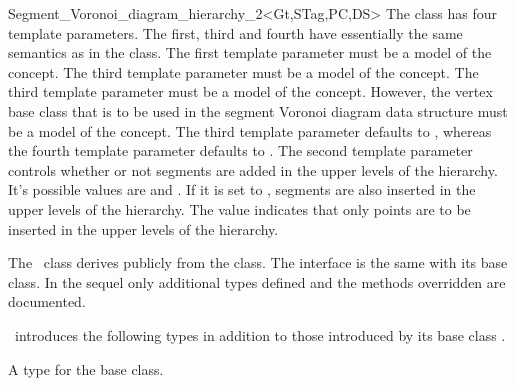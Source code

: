 \begin{ccRefClass}{Segment_Voronoi_diagram_hierarchy_2<Gt,STag,PC,DS>}
The class has four template parameters. The first, third and fourth
have essentially the same semantics as in the
 class. The
first template parameter must be a model of the
 concept.
The third template parameter must be a model of the
 concept. The third template parameter must be a
model of the 
concept. However, the vertex base class that is to be used in the
segment Voronoi diagram data structure must
be a model of the 
concept. The third template parameter defaults to
, whereas the fourth
template parameter defaults to
. The second template
parameter controls whether or not segments are added in the upper
levels of the hierarchy. It's possible values are 
and . If it is set to ,
segments are also inserted in the upper levels of the hierarchy. The
value  indicates that only points are to be
inserted in the upper levels of the hierarchy.


The \ccRefName\ class derives publicly from the
 class. The interface is
the same with its base class. In the sequel only additional types
defined and the methods overridden are documented.





\ccInheritsFrom
{}


\ccTypes
\ccRefName\ introduces the following types in addition to those
introduced by its base class
.

\ccThreeToTwo
{}
\ccGlue
{}
	  {A type for the base class.}


\end{ccRefClass}
